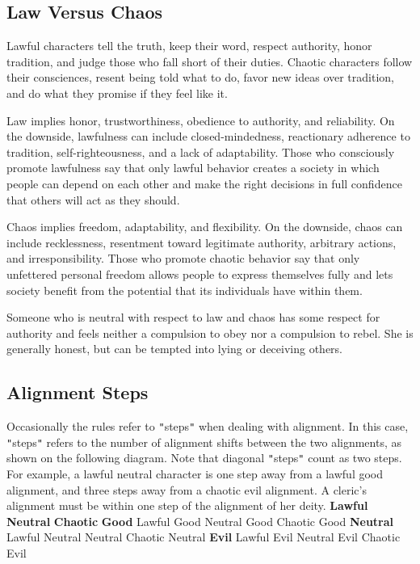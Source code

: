 \subsection{Law Versus Chaos}

				
Lawful characters tell the truth, keep their word, respect authority, honor tradition, and judge those who fall short of their duties. Chaotic characters follow their consciences, resent being told what to do, favor new ideas over tradition, and do what they promise if they feel like it.
				
Law implies honor, trustworthiness, obedience to authority, and reliability. On the downside, lawfulness can include closed-mindedness, reactionary adherence to tradition, self-righteousness, and a lack of adaptability. Those who consciously promote lawfulness say that only lawful behavior creates a society in which people can depend on each other and make the right decisions in full confidence that others will act as they should.
				
Chaos implies freedom, adaptability, and flexibility. On the downside, chaos can include recklessness, resentment toward legitimate authority, arbitrary actions, and irresponsibility. Those who promote chaotic behavior say that only unfettered personal freedom allows people to express themselves fully and lets society benefit from the potential that its individuals have within them.
				
Someone who is neutral with respect to law and chaos has some respect for authority and feels neither a compulsion to obey nor a compulsion to rebel. She is generally honest, but can be tempted into lying or deceiving others.
				
\subsection{Alignment Steps}

				
Occasionally the rules refer to \texttt{{}"{}}steps\texttt{{}"{}} when dealing with alignment. 
In this case, \texttt{{}"{}}steps\texttt{{}"{}} refers to the number of alignment shifts between 
the two alignments, as shown on the following diagram. Note that diagonal \texttt{{}"{}}steps\texttt{{}"{}}
count as two steps. For example, a lawful neutral character is one step away from a lawful good alignment, 
and three steps away from a chaotic evil alignment. A cleric's alignment must be within one step of the 
alignment of her deity. 
							\textbf{Lawful}
							\textbf{Neutral}
							\textbf{Chaotic}
																			\textbf{Good}
							Lawful Good
							Neutral Good
							Chaotic Good
																			\textbf{Neutral}
							Lawful Neutral
							Neutral
							Chaotic Neutral
																			\textbf{Evil}
							Lawful Evil
							Neutral Evil
							Chaotic Evil
														
